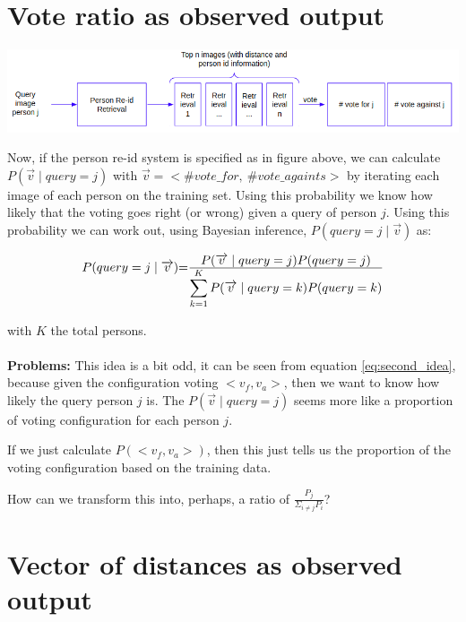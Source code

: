 \documentclass[10pt,a4paper,final]{article}
\begin{document}
\section{Vote ratio as observed output}

\includegraphics[width=\textwidth]{figures/second_idea.png}

Now, if the person re-id system is specified as in figure above, we can calculate $P(\overrightarrow{v} \mid query = j)$ with $\overrightarrow{v} = <\#vote\_for, ~\#vote\_againts>$ by iterating each image of each person on the training set. Using this probability we know how likely that the voting goes right (or wrong) given a query of person $j$. Using this probability we can work out, using Bayesian inference, $P(query=j \mid \overrightarrow{v})$ as:

\begin{equation}
	\label{eq:second_idea}
	\begin{tabular}{r@{=}l}
		$P(query=j \mid \overrightarrow{v})$ & $\frac{\displaystyle P(\overrightarrow{v} \mid query = j) P(query=j)}{\displaystyle\sum_{k=1}^{K} P(\overrightarrow{v} \mid query = k) P(query=k)}$ \\ 
	\end{tabular}
\end{equation}

\noindent with $K$ the total persons.
\\
\\
\noindent \textbf{Problems:}
This idea is a bit odd, it can be seen from equation \ref{eq:second_idea}, because given the configuration voting $<v_f, v_a>$, then we want to know how likely the query person $j$ is. The $P(\overrightarrow{v} \mid query = j)$ seems more like a proportion of voting configuration for each person $j$.

If we just calculate $P(<v_f, v_a>)$, then this just tells us the proportion of the voting configuration based on the training data.

How can we transform this into, perhaps, a ratio of $\displaystyle\frac{P_j}{\Sigma_{i \neq j} P_i}$? 

\section{Vector of distances as observed output}
\end{document}
